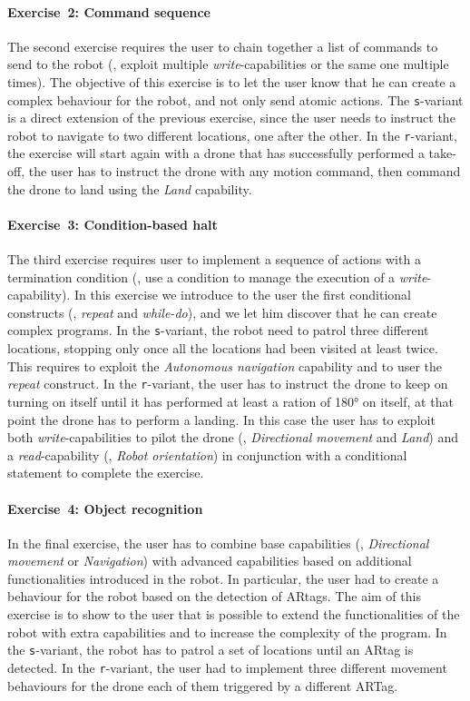 \paragraph{Exercise~2: Command sequence} The second exercise requires the user to chain together a list of commands to send to the robot (\ie, exploit multiple \textit{write}-capabilities or the same one multiple times). The objective of this exercise is to let the user know that he can create a complex behaviour for the robot, and not only send atomic actions. The \texttt{s}-variant is a direct extension of the previous exercise, since the user needs to instruct the robot to navigate to two different locations, one after the other. In the \texttt{r}-variant, the exercise will start again with a drone that has successfully performed a take-off, the user has to instruct the drone with any motion command, then command the drone to land using the \textit{Land} capability. 

\paragraph{Exercise~3: Condition-based halt} The third exercise requires user to implement a sequence of actions with a termination condition (\ie, use a condition to manage the execution of a \textit{write}-capability). In this exercise we introduce to the user the first conditional constructs (\eg, \textit{repeat} and \textit{while-do}), and we let him discover that he can create complex programs. In the \texttt{s}-variant, the robot need to patrol three different locations, stopping only once all the locations had been visited at least twice. This requires to exploit the \textit{Autonomous navigation} capability and to user the \textit{repeat} construct. In the \texttt{r}-variant, the user has to instruct the drone to keep on turning on itself until it has performed at least a ration of \ang{180} on itself, at that point the drone has to perform a landing. In this case the user has to exploit both \textit{write}-capabilities to pilot the drone (\ie, \textit{Directional movement} and \textit{Land}) and a \textit{read}-capability (\ie, \textit{Robot orientation}) in conjunction with a conditional statement to complete the exercise.

\paragraph{Exercise~4: Object recognition} In the final exercise, the user has to combine base capabilities (\eg, \textit{Directional movement} or \textit{Navigation}) with advanced capabilities based on additional functionalities introduced in the robot. In particular, the user had to create a behaviour for the robot based on the detection of ARtags. The aim of this exercise is to show to the user that is possible to extend the functionalities of the robot with extra capabilities and to increase the complexity of the program. In the \texttt{s}-variant, the robot has to patrol a set of locations until an ARtag is detected. In the \texttt{r}-variant, the user had to implement three different movement behaviours for the drone each of them triggered by a different ARTag.

